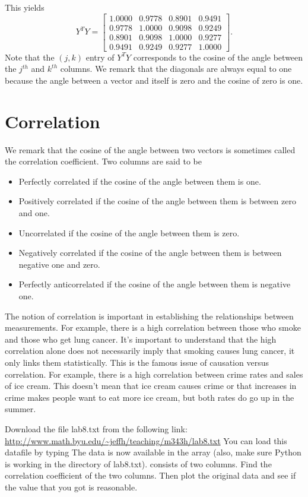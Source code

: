 This yields
\[
Y^T Y = 
\begin{bmatrix}
1.0000 & 0.9778 & 0.8901 & 0.9491\\
0.9778 & 1.0000 & 0.9098 & 0.9249\\
0.8901 & 0.9098 & 1.0000 & 0.9277\\
0.9491 & 0.9249 & 0.9277 & 1.0000
\end{bmatrix}.
\]
Note that the $(j,k)$ entry of $Y^T Y$ corresponds to the cosine of the angle between the $j^{th}$ and $k^{th}$ columns.  We remark that the diagonals are always equal to one because the angle between a vector and itself is zero and the cosine of zero is one.

\section*{Correlation}

We remark that the cosine of the angle between two vectors is sometimes called the correlation coefficient.  Two columns are said to be 
\begin{itemize}
\item Perfectly correlated if the cosine of the angle between them is one.
\item Positively correlated if the cosine of the angle between them is between zero and one.
\item Uncorrelated if the cosine of the angle between them is zero.
\item Negatively correlated if the cosine of the angle between them is between negative one and zero.
\item Perfectly anticorrelated if the cosine of the angle between them is negative one.
\end{itemize}

The notion of correlation is important in establishing the relationships between measurements.  For example, there is a high correlation between those who smoke and those who get lung cancer.  It's important to understand that the high correlation alone does not necessarily imply that smoking causes lung cancer, it only links them statistically.  This is the famous issue of causation versus correlation.  For example, there is a high correlation between crime rates and sales of ice cream.  This doesn't mean that ice cream causes crime or that increases in crime makes people want to eat more ice cream, but both rates do go up in the summer.

\begin{problem}
Download the file lab8.txt from the following link:
\url{http://www.math.byu.edu/~jeffh/teaching/m343h/lab8.txt}
You can load this datafile by typing
The data is now available in the array  (also, make sure Python is working in the directory of lab8.txt).   consists of two columns.  Find the correlation coefficient of the two columns.  Then plot the original data and see if the value that you got is reasonable.
\end{problem}



